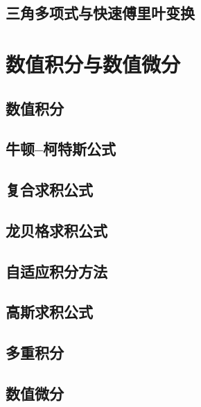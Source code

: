 \section{三角多项式与快速傅里叶变换}

\chapter{数值积分与数值微分}
\section{数值积分}
\section{牛顿--柯特斯公式}
\section{复合求积公式}
\section{龙贝格求积公式}
\section{自适应积分方法}
\section{高斯求积公式}
\section{多重积分}
\section{数值微分}
